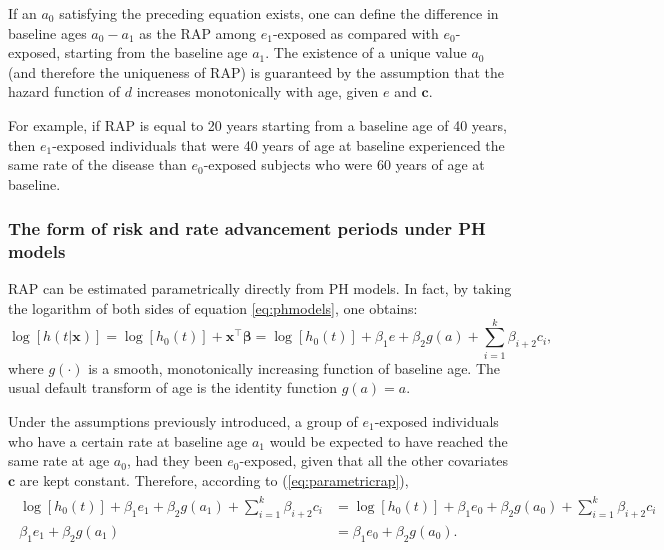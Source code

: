 If an $a_0$ satisfying the preceding equation exists, one can define the difference in baseline ages $a_0-a_1$ as the RAP among $e_1$-exposed as compared with $e_0$-exposed, starting from the baseline age $a_1$. The existence of a unique value $a_0$ (and therefore the uniqueness of RAP) is guaranteed by the assumption that the hazard function of $d$ increases monotonically with age, given $e$ and $\mathbf{c}$.

For example, if RAP is equal to 20 years starting from a baseline age of 40 years, then $e_1$-exposed individuals that were 40 years of age at baseline experienced the same rate of the disease than $e_0$-exposed subjects who were 60 years of age at baseline.

\subsubsection{The form of risk and rate advancement periods under PH models}

RAP can be estimated parametrically directly from PH models. In fact, by taking the logarithm of both sides of equation \ref{eq:phmodels}, one obtains:
\begin{equation}
\log\left[h(t|\mathbf{x})\right] = \log \left[ h_0(t) \right] +\mathbf{x}^\top\boldsymbol{\beta} = \log \left[ h_0(t) \right] + \beta_1 e + \beta_2 g(a) + \sum_{i=1}^k \beta_{i+2}c_i,
\label{eq:parametricrap}
\end{equation}
where $g(\cdot)$ is a smooth, monotonically increasing function of baseline age. The usual default transform of age is the identity function $g(a) = a$.

Under the assumptions previously introduced, a group of $e_1$-exposed individuals who have a certain rate at baseline age $a_1$ would be expected to have reached the same rate at age $a_0$, had they been $e_0$-exposed, given that all the other covariates $\mathbf{c}$ are kept constant. Therefore, according to (\ref{eq:parametricrap}),
\begin{align}
\begin{split}
\log \left[ h_0(t) \right] + \beta_1 e_1 + \beta_2 g(a_1) + \sum_{i=1}^k \beta_{i+2}c_i &= \log \left[ h_0(t) \right] + \beta_1 e_0 + \beta_2 g(a_0) + \sum_{i=1}^k \beta_{i+2}c_i \\
\beta_1 e_1 + \beta_2 g(a_1) &=  \beta_1 e_0 + \beta_2 g(a_0). \label{eq:rapsimplified}
\end{split}
\end{align}

